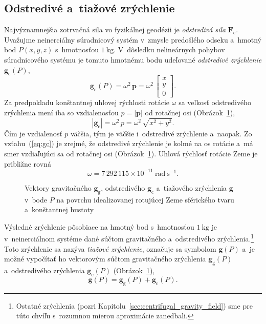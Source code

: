 \documentclass[a4paper, 12pt]{book}
\newcommand{\gidx}{\mathrm g}
\newcommand{\cidx}{\mathrm c}
\let\vec\mathbf
\begin{document}
\subsection{Odstredivé a~tiažové zrýchlenie}

Najvýznamnejšia zotrvačná sila vo fyzikálnej geodézii je \emph{odstredivá sila} 
$\vec F_\cidx$.  Uvažujme neinerciálny súradnicový systém v~zmysle predošlého 
odseku a~hmotný bod $P(x, y, z)$ s~hmotnosťou $1\ \mathrm{kg}$.  V~dôsledku 
nelineárnych pohybov súradnicového systému je tomuto hmotnému bodu udeľované 
\emph{odstredivé zrýchlenie} $\vec g_\cidx(P)$,
%
\begin{equation}
\label{eq:gc}
\vec g_\cidx(P) = \omega^2 \, \vec p =
%
\omega^2 \, \begin{bmatrix}
x\\
y\\
0
\end{bmatrix}
{.}
\end{equation}
%
Za predpokladu konštantnej uhlovej rýchlosti rotácie $\omega$ sa veľkosť 
odstredivého zrýchlenia mení iba so vzdialenosťou $p = | \vec p |$ od rotačnej 
osi (Obrázok~\ref{fig:gravity_vector}),
%
\begin{equation}
| \vec g_\cidx | = \omega^2 \, p = \omega^2 \, \sqrt{x^2 + y^2}{.}
\end{equation}
%
Čím je vzdialenosť $p$ väčšia, tým je väčšie i~odstredivé zrýchlenie a~naopak.  
Zo vzťahu~(\ref{eq:gc}) je zrejmé, že odstredivé zrýchlenie je kolmé na os 
rotácie a~má smer vzdiaľujúci sa od rotačnej osi 
(Obrázok~\ref{fig:gravity_vector}).  Uhlová rýchlosť rotácie Zeme je približne 
rovná \citep{GRS80}
%
\begin{equation}
\omega = 7\, 292\, 115 \times 10^{-11} \ \mathrm{rad} \ \mathrm{s}^{-1}{.}
\end{equation}

\begin{figure}
\centering

\caption{Vektory gravitačného $\vec g_\gidx$, odstredivého $\vec g_\cidx$ 
a~tiažového zrýchlenia $\vec g$ v~bode $P$ na povrchu idealizovanej rotujúcej 
Zeme sférického tvaru a~konštantnej hustoty}
\label{fig:gravity_vector}
\end{figure}

Výsledné zrýchlenie pôsobiace na hmotný bod s~hmotnosťou $1 \ \mathrm{kg}$ je 
v~neinerciálnom systéme dané súčtom gravitačného a~odstredivého 
zrýchlenia.\footnote{Ostatné zrýchlenia (pozri 
Kapitolu~\ref{sec:centrifugal_gravity_field}) sme pre túto chvíľu s~rozumnou 
mierou aproximácie zanedbali.}  Toto zrýchlenie sa nazýva \emph{tiažové 
zrýchlenie}, označuje sa symbolom $\vec g(P)$ a~je možné vypočítať ho 
vektorovým súčtom gravitačného zrýchlenia $\vec g_\gidx(P)$ a~odstredivého 
zrýchlenia $\vec g_\cidx(P)$ (Obrázok~\ref{fig:gravity_vector}),
%
\begin{equation}
\label{eq:g}
\vec g(P) = \vec g_\gidx(P) + \vec g_\cidx(P){.}
\end{equation}
\end{document}
